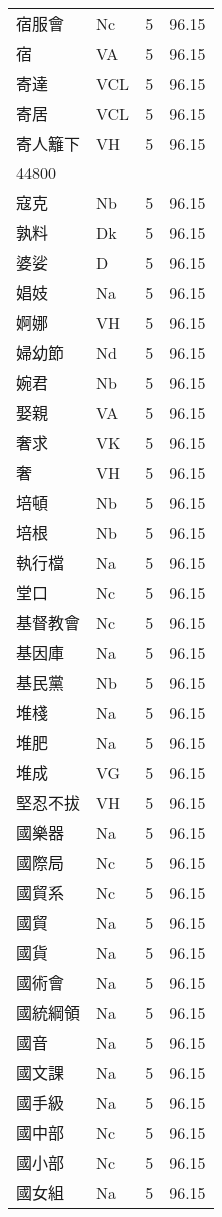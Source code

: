 \documentclass[twocolumn]{book}
\begin{document}
\begin{supertabular}{llrr}
宿服會 & Nc & 5 &  96.15\\
宿 & VA & 5 &  96.15\\
寄達 & VCL & 5 &  96.15\\
寄居 & VCL & 5 &  96.15\\
寄人籬下 & VH & 5 &  96.15\\
44800\\
寇克 & Nb & 5 &  96.15\\
孰料 & Dk & 5 &  96.15\\
婆娑 & D & 5 &  96.15\\
娼妓 & Na & 5 &  96.15\\
婀娜 & VH & 5 &  96.15\\
婦幼節 & Nd & 5 &  96.15\\
婉君 & Nb & 5 &  96.15\\
娶親 & VA & 5 &  96.15\\
奢求 & VK & 5 &  96.15\\
奢 & VH & 5 &  96.15\\
培頓 & Nb & 5 &  96.15\\
培根 & Nb & 5 &  96.15\\
執行檔 & Na & 5 &  96.15\\
堂口 & Nc & 5 &  96.15\\
基督教會 & Nc & 5 &  96.15\\
基因庫 & Na & 5 &  96.15\\
基民黨 & Nb & 5 &  96.15\\
堆棧 & Na & 5 &  96.15\\
堆肥 & Na & 5 &  96.15\\
堆成 & VG & 5 &  96.15\\
堅忍不拔 & VH & 5 &  96.15\\
國樂器 & Na & 5 &  96.15\\
國際局 & Nc & 5 &  96.15\\
國貿系 & Nc & 5 &  96.15\\
國貿 & Na & 5 &  96.15\\
國貨 & Na & 5 &  96.15\\
國術會 & Na & 5 &  96.15\\
國統綱領 & Na & 5 &  96.15\\
國音 & Na & 5 &  96.15\\
國文課 & Na & 5 &  96.15\\
國手級 & Na & 5 &  96.15\\
國中部 & Nc & 5 &  96.15\\
國小部 & Nc & 5 &  96.15\\
國女組 & Na & 5 &  96.15\\

\end{supertabular}
\end{document}

